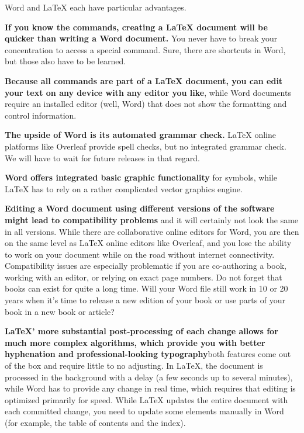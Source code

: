 

Word and LaTeX each have particular advantages.

\textbf{If you know the commands, creating a LaTeX document will be quicker than writing a Word document.} You never have to break your concentration to access a special command. Sure, there are shortcuts in Word, but those also have to be learned.

\textbf{Because all commands are part of a LaTeX document, you can edit your text on any device with any editor you like}, while Word documents require an installed editor (well, Word) that does not show the formatting and control information.

\textbf{The upside of Word is its automated grammar check.} LaTeX online platforms like Overleaf provide spell checks, but no integrated grammar check. We will have to wait for future releases in that regard. 

\textbf{Word offers integrated basic graphic functionality} for symbols, while LaTeX has to rely on a rather complicated vector graphics engine.

\textbf{Editing a Word document using different versions of the software might lead to compatibility problems} and it will certainly not look the same in all versions. While there are collaborative online editors for Word, you are then on the same level as LaTeX online editors like Overleaf, and you lose the ability to work on your document while on the road without internet connectivity. Compatibility issues are especially problematic if you are co-authoring a book, working with an editor, or relying on exact page numbers. Do not forget that books can exist for quite a long time. Will your Word file still work in 10 or 20 years when it's time to release a new edition of your book or use parts of your book in a new book or article?

\textbf{LaTeX' more substantial post-processing of each change allows for much more complex algorithms, which provide you with better hyphenation and professional\hyp{}looking typography}\emdash{}both features come out of the box and require little to no adjusting. In LaTeX, the document is processed in the background with a delay (a few seconds up to several minutes), while Word has to provide any change in real time, which requires that editing is optimized primarily for speed. While LaTeX updates the entire document with each committed change, you need to update some elements manually in Word (for example, the table of contents and the index). 

